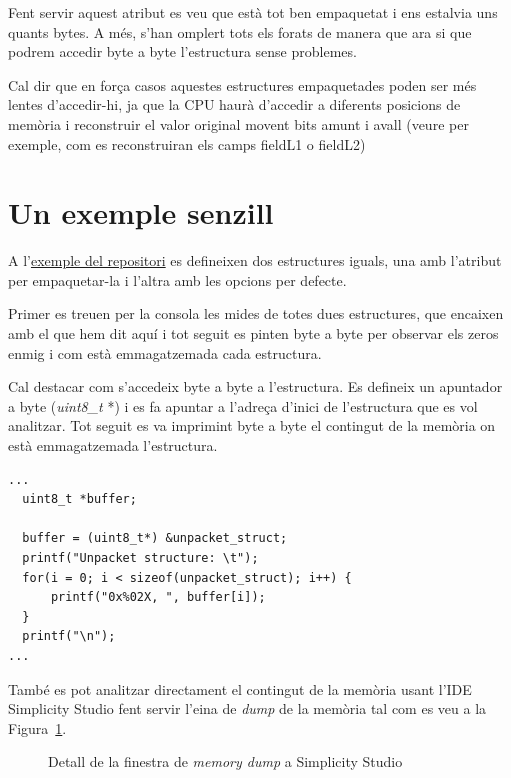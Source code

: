 Fent servir aquest atribut es veu que està tot ben empaquetat i ens estalvia uns quants bytes. A més, s'han omplert tots els forats de manera que ara si que podrem accedir byte a byte l'estructura sense problemes.

Cal dir que en força casos aquestes estructures empaquetades poden ser més lentes d'accedir-hi, ja que la CPU haurà d'accedir a diferents posicions de memòria i reconstruir el valor original movent bits amunt i avall (veure per exemple, com es reconstruiran els camps fieldL1 o fieldL2)

\section{Un exemple senzill}

A l'\href{https://github.com/mariusmm/cursembedded/tree/master/Simplicity/Structures}{exemple del repositori} es defineixen dos estructures iguals, una amb l'atribut per empaquetar-la i l'altra amb les opcions per defecte.

Primer es treuen per la consola les mides de totes dues estructures, que encaixen amb el que hem dit aquí i tot seguit es pinten byte a byte per observar els zeros enmig i com està emmagatzemada cada estructura.

Cal destacar com s'accedeix byte a byte a l'estructura. Es defineix un apuntador a byte ({\em uint8\_t} *) i es fa apuntar a l'adreça d'inici de l'estructura que es vol analitzar. Tot seguit es va imprimint byte a byte el contingut de la memòria on està emmagatzemada l'estructura.

\begin{lstlisting}[style=customc,caption={Estructura d'exemple empaquetada},label=struct_example]
...
  uint8_t *buffer;

  buffer = (uint8_t*) &unpacket_struct;
  printf("Unpacket structure: \t");
  for(i = 0; i < sizeof(unpacket_struct); i++) {
	  printf("0x%02X, ", buffer[i]);
  }
  printf("\n");
...
\end{lstlisting}


També es pot analitzar directament el contingut de la memòria usant l'IDE Simplicity Studio fent servir l'eina de {\em dump} de la memòria tal com es veu a la Figura~\ref{fig:UnpackedMemoryStructure}.

\begin{figure}
 \centering
 \caption{Detall de la finestra de {\em memory dump} a Simplicity Studio}
 \label{fig:UnpackedMemoryStructure}
\end{figure}


